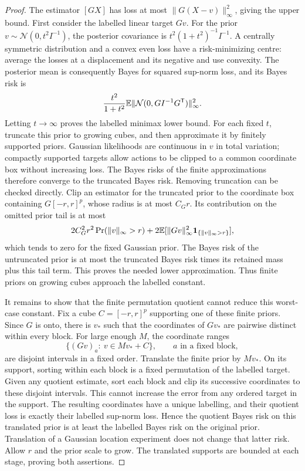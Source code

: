 \begin{proof}
The estimator $[GX]$ has loss at most $\|G(X-v)\|_\infty^2$, giving
the upper bound. First consider the labelled linear target $Gv$.
For the prior $v\sim\mathcal N(0,t^2I^{-1})$, the posterior covariance
is $t^2(1+t^2)^{-1}I^{-1}$. A centrally symmetric distribution and a
convex even loss have a risk-minimizing centre: average the losses at
a displacement and its negative and use convexity. The posterior mean
is consequently Bayes for squared sup-norm loss, and its Bayes risk is
\[
 \frac{t^2}{1+t^2}\mathbb E\|\mathcal N(0,GI^{-1}G^{\mathsf T})\|_\infty^2.
\]
Letting $t\to\infty$ proves the labelled minimax lower bound. For each
fixed $t$, truncate this prior to growing cubes, and then approximate
it by finitely supported priors. Gaussian likelihoods are continuous in
$v$ in total variation; compactly supported targets allow actions to be
clipped to a common coordinate box without increasing loss. The Bayes
risks of the finite approximations therefore converge to the truncated
Bayes risk. Removing truncation can be checked directly. Clip an estimator for the
truncated prior to the coordinate box containing $G[-r,r]^p$, whose
radius is at most $C_G r$. Its contribution on the omitted prior tail
is at most
\[
 2C_G^2r^2\Pr(\|v\|_\infty>r)
       +2\mathbb E[\|Gv\|_\infty^2\mathbf1_{\{\|v\|_\infty>r\}}],
\]
which tends to zero for the fixed Gaussian prior. The Bayes risk of the
untruncated prior is at most the truncated Bayes risk times its retained
mass plus this tail term. This proves the needed lower approximation. Thus finite priors on growing cubes
approach the labelled constant.

It remains to show that the finite permutation quotient cannot reduce
this worst-case constant. Fix a cube $C=[-r,r]^p$ supporting one of
these finite priors. Since $G$ is onto, there is $v_*$ such that the
coordinates of $Gv_*$ are pairwise distinct within every block. For
large enough $M$, the coordinate ranges
\[
 \{(Gv)_a:\ v\in Mv_*+C\},\qquad a\text{ in a fixed block},
\]
are disjoint intervals in a fixed order. Translate the finite prior by
$Mv_*$. On its support, sorting within each block is a fixed permutation
of the labelled target. Given any quotient estimate, sort each block
and clip its successive coordinates to these disjoint intervals. This
cannot increase the error from any ordered target in the support. The
resulting coordinates have a unique labelling, and their quotient loss
is exactly their labelled sup-norm loss. Hence the quotient Bayes risk
on this translated prior is at least the labelled Bayes risk on the
original prior. Translation of a Gaussian location experiment does not
change that latter risk. Allow $r$ and the prior scale to grow. The
translated supports are bounded at each stage, proving both assertions.
\end{proof}

